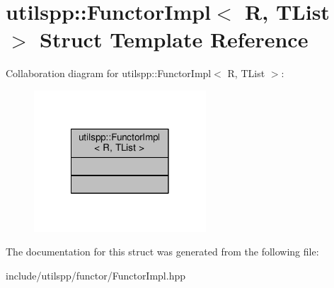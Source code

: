 \hypertarget{structutilspp_1_1FunctorImpl}{\section{utilspp\-:\-:Functor\-Impl$<$ R, T\-List $>$ Struct Template Reference}
\label{structutilspp_1_1FunctorImpl}
}


Collaboration diagram for utilspp\-:\-:Functor\-Impl$<$ R, T\-List $>$\-:
\nopagebreak
\begin{figure}[H]
\begin{center}
\leavevmode
\includegraphics[width=182pt]{structutilspp_1_1FunctorImpl__coll__graph}
\end{center}
\end{figure}


The documentation for this struct was generated from the following file\-:\begin{DoxyCompactItemize}
\item 
include/utilspp/functor/Functor\-Impl.\-hpp\end{DoxyCompactItemize}
